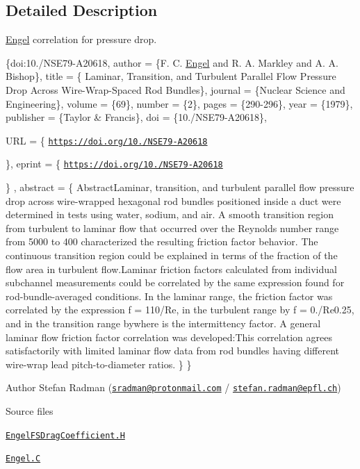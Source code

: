 \subsection{Detailed Description}
\hyperlink{classFoam_1_1FSDragCoefficientModels_1_1Engel}{Engel} correlation for pressure drop. 

\label{_Description}%
 \{doi\+:10./\+N\+S\+E79-\/\+A20618, author = \{F. C. \hyperlink{classFoam_1_1FSDragCoefficientModels_1_1Engel}{Engel} and R. A. Markley and A. A. Bishop\}, title = \{ Laminar, Transition, and Turbulent Parallel Flow Pressure Drop Across Wire-\/\+Wrap-\/\+Spaced Rod Bundles\}, journal = \{Nuclear Science and Engineering\}, volume = \{69\}, number = \{2\}, pages = \{290-\/296\}, year = \{1979\}, publisher = \{Taylor \& Francis\}, doi = \{10./\+N\+S\+E79-\/\+A20618\},

U\+RL = \{ \href{https://doi.org/10.13182/NSE79-A20618}{\tt https\+://doi.\+org/10./\+N\+S\+E79-\/\+A20618}

\}, eprint = \{ \href{https://doi.org/10.13182/NSE79-A20618}{\tt https\+://doi.\+org/10./\+N\+S\+E79-\/\+A20618}

\} , abstract = \{ Abstract\+Laminar, transition, and turbulent parallel flow pressure drop across wire-\/wrapped hexagonal rod bundles positioned inside a duct were determined in tests using water, sodium, and air. A smooth transition region from turbulent to laminar flow that occurred over the Reynolds number range from 5000 to 400 characterized the resulting friction factor behavior. The continuous transition region could be explained in terms of the fraction of the flow area in turbulent flow.\+Laminar friction factors calculated from individual subchannel measurements could be correlated by the same expression found for rod-\/bundle-\/averaged conditions. In the laminar range, the friction factor was correlated by the expression f = 110/\+Re, in the turbulent range by f = 0./\+Re0.25, and in the transition range bywhere is the intermittency factor. A general laminar flow friction factor correlation was developed\+:This correlation agrees satisfactorily with limited laminar flow data from rod bundles having different wire-\/wrap lead pitch-\/to-\/diameter ratios. \} \}

Author Stefan Radman (\href{mailto:sradman@protonmail.com}{\tt sradman@protonmail.\+com} / \href{mailto:stefan.radman@epfl.ch}{\tt stefan.\+radman@epfl.\+ch})

\begin{DoxyParagraph}{Source files}

\begin{DoxyItemize}
\item \href{../../../home/carlo/data/GeN-Foam/GeN-Foam_ffn/GeN-Foam/GeN-Foam/classes/thermalHydraulics/src/physicsModels/dragModels/FSDragCoefficientModels/Engel/EngelFSDragCoefficient.H}{\tt Engel\+F\+S\+Drag\+Coefficient.\+H} 
\item \href{../../../home/carlo/data/GeN-Foam/GeN-Foam_ffn/GeN-Foam/GeN-Foam/classes/thermalHydraulics/src/physicsModels/dragModels/FSDragCoefficientModels/Engel/Engel.C}{\tt Engel.\+C} 
\end{DoxyItemize}
\end{DoxyParagraph}


